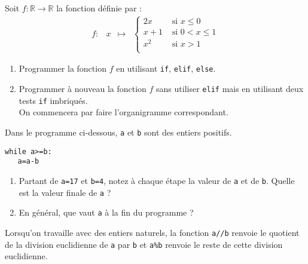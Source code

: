 \begin{exercice}
Soit $f\colon\mathbb{R}\to \mathbb{R}$ la fonction d\' efinie par :
\[\begin{array}{ccccc}
f\colon  & x & \longmapsto & \left\lbrace\begin{array}{ll}
      2x & \text{ si } x\leq 0\\
      x+1 & \text{ si } 0<x\leq 1\\
      x^2 & \text{ si } x>1\\
      \end{array}\right.
\end{array}\]
\begin{enumerate}
\item Programmer la fonction $f$ en utilisant \verb?if?, \verb?elif?, \verb?else?.
\item Programmer \` a nouveau la fonction $f$ sans utiliser \verb?elif? mais en utilisant deux tests \verb?if? imbriqu\' es. \\
On commencera par faire l'organigramme correspondant. 
\end{enumerate}
\end{exercice}
\bigskip


\begin{exercice}
Dans le programme ci-dessous, \verb?a? et \verb?b? sont des entiers positifs.
\begin{verbatim}
while a>=b:
   a=a-b
\end{verbatim}
\begin{enumerate}
\item Partant de \verb?a=17? et \verb?b=4?, notez \` a chaque \' etape la valeur de \verb?a? et de \verb?b?. Quelle est la valeur finale de \verb?a? ?
\item En g\' en\' eral, que vaut \verb?a? à la fin du programme ?
\end{enumerate} 
\end{exercice}
\bigskip


\begin{rappel}
Lorsqu'on travaille avec des entiers naturels, la fonction \verb?a//b? renvoie le quotient de la division euclidienne de \verb?a? par \verb?b? et \verb?a%b? renvoie le reste de cette division euclidienne.
\end{rappel}
\bigskip



